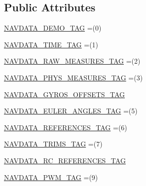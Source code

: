 \subsection*{Public Attributes}
\begin{DoxyCompactItemize}
\item 
\hyperlink{enumworkspace_1_1_a_r_drone_nav_data_1_1src_1_1controller_1_1_nav_data_tag_ac559118f6ba8089edd6343e83e01239a}{N\+A\+V\+D\+A\+T\+A\+\_\+\+D\+E\+M\+O\+\_\+\+T\+A\+G} =(0)
\item 
\hyperlink{enumworkspace_1_1_a_r_drone_nav_data_1_1src_1_1controller_1_1_nav_data_tag_a115dab34c3a0bcf05aadabbbfa0b902b}{N\+A\+V\+D\+A\+T\+A\+\_\+\+T\+I\+M\+E\+\_\+\+T\+A\+G} =(1)
\item 
\hyperlink{enumworkspace_1_1_a_r_drone_nav_data_1_1src_1_1controller_1_1_nav_data_tag_a7f8b8242e872c92f8e9f19d7e5b41b55}{N\+A\+V\+D\+A\+T\+A\+\_\+\+R\+A\+W\+\_\+\+M\+E\+A\+S\+U\+R\+E\+S\+\_\+\+T\+A\+G} =(2)
\item 
\hyperlink{enumworkspace_1_1_a_r_drone_nav_data_1_1src_1_1controller_1_1_nav_data_tag_a25e55cf604aef8bad8688d467d778687}{N\+A\+V\+D\+A\+T\+A\+\_\+\+P\+H\+Y\+S\+\_\+\+M\+E\+A\+S\+U\+R\+E\+S\+\_\+\+T\+A\+G} =(3)
\item 
\hyperlink{enumworkspace_1_1_a_r_drone_nav_data_1_1src_1_1controller_1_1_nav_data_tag_a9d7bc1f10c5bfb590f9039d75a98fbce}{N\+A\+V\+D\+A\+T\+A\+\_\+\+G\+Y\+R\+O\+S\+\_\+\+O\+F\+F\+S\+E\+T\+S\+\_\+\+T\+A\+G}
\item 
\hyperlink{enumworkspace_1_1_a_r_drone_nav_data_1_1src_1_1controller_1_1_nav_data_tag_a639763984a8a9ae0bb41f3f2ba87ab36}{N\+A\+V\+D\+A\+T\+A\+\_\+\+E\+U\+L\+E\+R\+\_\+\+A\+N\+G\+L\+E\+S\+\_\+\+T\+A\+G} =(5)
\item 
\hyperlink{enumworkspace_1_1_a_r_drone_nav_data_1_1src_1_1controller_1_1_nav_data_tag_ae39c1c59ef987f5ebdaf78a1fc006dcd}{N\+A\+V\+D\+A\+T\+A\+\_\+\+R\+E\+F\+E\+R\+E\+N\+C\+E\+S\+\_\+\+T\+A\+G} =(6)
\item 
\hyperlink{enumworkspace_1_1_a_r_drone_nav_data_1_1src_1_1controller_1_1_nav_data_tag_a7310e168c17b1219f0fe5bf68824554d}{N\+A\+V\+D\+A\+T\+A\+\_\+\+T\+R\+I\+M\+S\+\_\+\+T\+A\+G} =(7)
\item 
\hyperlink{enumworkspace_1_1_a_r_drone_nav_data_1_1src_1_1controller_1_1_nav_data_tag_a8d205fd586c25897fe2eb8c923af71d0}{N\+A\+V\+D\+A\+T\+A\+\_\+\+R\+C\+\_\+\+R\+E\+F\+E\+R\+E\+N\+C\+E\+S\+\_\+\+T\+A\+G}
\item 
\hyperlink{enumworkspace_1_1_a_r_drone_nav_data_1_1src_1_1controller_1_1_nav_data_tag_aa678ee2bba41d3f2163fbd978c2dd972}{N\+A\+V\+D\+A\+T\+A\+\_\+\+P\+W\+M\+\_\+\+T\+A\+G} =(9)

\end{DoxyCompactItemize}
